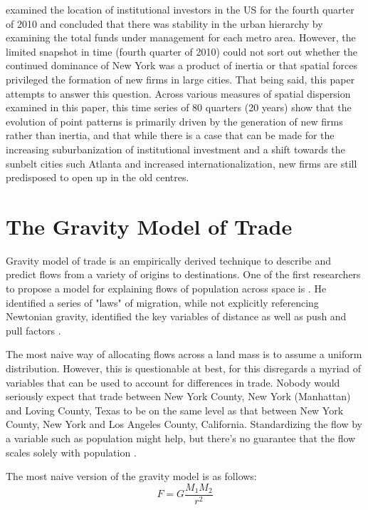 \cite{GreenOLef2014} examined the location of institutional investors in the US for the fourth quarter of 2010 and concluded that there was stability in the urban hierarchy by examining the total funds under management for each metro area.  However, the limited snapshot in time (fourth quarter of 2010) could not sort out whether the continued dominance of New York was a product of inertia or that spatial forces privileged the formation of new firms in large cities.  That being said, this paper attempts to answer this question.  Across various measures of spatial dispersion examined in this paper,  this time series of 80 quarters (20 years) show that the evolution of point patterns is primarily driven by the generation of new firms rather than inertia, and that while there is a case that can be made for the increasing suburbanization  of institutional investment and a shift towards the sunbelt cities such Atlanta and increased internationalization, new firms are still predisposed to open up in the old centres.


\section{The Gravity Model of Trade}


Gravity model of trade is an empirically derived technique to describe and predict flows from a variety of origins to destinations.  One of the first researchers to propose a model for explaining flows of population across space is  \cite{ravenstein1885laws}. He identified a series of "laws" of migration, while not explicitly referencing Newtonian gravity, identified the key variables of distance as well as push and pull factors \citep{Tobler1995}.  

The most naive way of allocating flows across a land mass is to assume a uniform distribution.  However, this is questionable at best, for this disregards a myriad of variables that can be used to account for differences in trade.  Nobody would seriously expect that trade between New York County, New York (Manhattan) and Loving County, Texas to be on the same level as that between New York County, New York and Los Angeles County, California.  Standardizing the flow by a variable such as population might help, but there's no guarantee that the flow scales solely with population \citep{Crymble19}.   

The most naive version of the gravity model is as follows:
\begin{equation}
F = G \frac{M_{1}M_{2}}{r^{2}}
\label{Naive_Gravity_Model}
\end{equation}  

